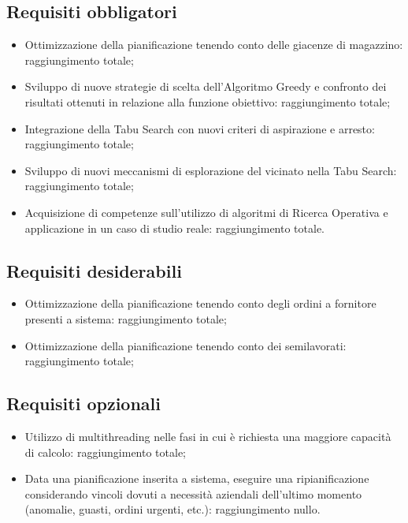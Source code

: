 \subsection{Requisiti obbligatori}
\begin{itemize}
	\item Ottimizzazione della pianificazione tenendo conto delle giacenze
	di magazzino: raggiungimento totale;
	\item Sviluppo di nuove strategie di scelta dell’Algoritmo Greedy e
	confronto dei risultati ottenuti in relazione alla funzione obiettivo: raggiungimento totale;
	\item Integrazione della Tabu Search con nuovi criteri di aspirazione e
	arresto: raggiungimento totale;
	\item Sviluppo di nuovi meccanismi di esplorazione del vicinato nella
	Tabu Search: raggiungimento totale;
	\item Acquisizione di competenze sull’utilizzo di algoritmi di Ricerca
	Operativa e applicazione in un caso di studio reale: raggiungimento totale.

	
\end{itemize}

\subsection{Requisiti desiderabili}
\begin{itemize}
	\item Ottimizzazione della pianificazione tenendo conto degli ordini a
	fornitore presenti a sistema: raggiungimento totale;
	\item Ottimizzazione della pianificazione tenendo conto dei
	semilavorati: raggiungimento totale;
\end{itemize}

\subsection{Requisiti opzionali}
\begin{itemize}
	\item Utilizzo di multithreading nelle fasi in cui è richiesta una maggiore
	capacità di calcolo: raggiungimento totale;
	\item Data una pianificazione inserita a sistema, eseguire una
	ripianificazione considerando vincoli dovuti a necessità aziendali
	dell’ultimo momento (anomalie, guasti, ordini urgenti, etc.): raggiungimento nullo.
\end{itemize}

